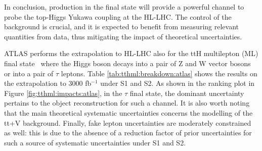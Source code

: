 In conclusion, \ttH production in the \Htobb final state will provide a powerful channel to probe the top-Higgs Yukawa coupling at the HL-LHC.
The control of the \ttHF background is crucial, and it is expected to benefit from measuring relevant quantities from data, thus mitigating the impact of theoretical uncertainties.

ATLAS performs the extrapolation to HL-LHC also for the ttH multilepton (ML) final state~\cite{ATLAS-PHYS-PUB-2018-XY} where the Higgs boson decays into a pair of Z and W vector bosons or into a pair of $\tau$ leptons. Table \ref{tab:tthml:breakdown:atlas} shows the results on the extrapolation to 3000 fb$^{-1}$ under S1 and S2. As shown in the ranking plot in Figure \ref{fig:tthml:impacts:atlas}, in the $\tau$ final state, the dominant uncertainty pertains to the object reconstruction for such a channel. It is also worth noting that the main theoretical systematic uncertainties concerns the modelling of the tt+V background. Finally, fake lepton uncertainties are moderately constrained as well: this is due to the absence of a reduction factor of prior uncertainties for such a source of systematic uncertainties under S1 and S2. 
